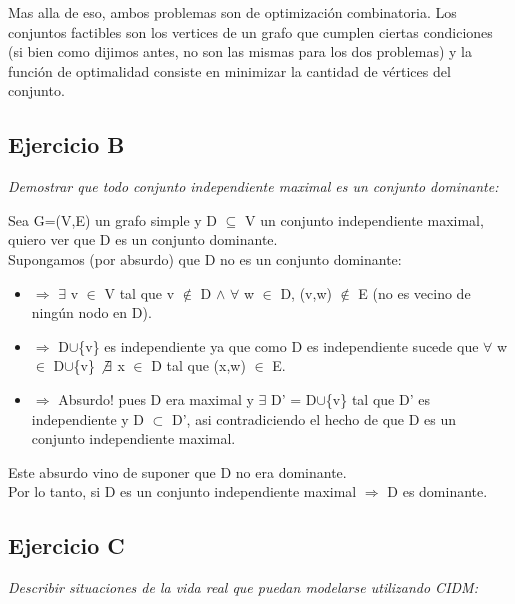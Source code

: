 Mas alla de eso, ambos problemas son de optimización combinatoria. Los conjuntos factibles son los vertices de un grafo que cumplen ciertas condiciones (si bien como dijimos antes, no son las mismas para los dos problemas) y la función de optimalidad consiste en minimizar la cantidad de vértices del conjunto.

\newpage

\subsection{Ejercicio B}

\textit{Demostrar que todo conjunto independiente maximal es un conjunto dominante:}

\medskip

Sea G=(V,E) un grafo simple y D $\subseteq$ V un conjunto independiente maximal, quiero ver que D es un conjunto dominante.\\
Supongamos (por absurdo) que D no es un conjunto dominante:
\begin{itemize}
\item[] $\Rightarrow$ $\exists$ v $\in$ V tal que v $\not\in$ D $\wedge$ $\forall$ w $\in$ D, (v,w) $\not\in$ E (no es vecino de ningún nodo en D).
\item[] $\Rightarrow$ D$\cup$\{v\} es independiente ya que como D es independiente sucede que $\forall$ w $\in$ D$\cup$\{v\} $\not\exists$ x $\in$ D tal que (x,w) $\in$ E.
\item[] $\Rightarrow$ Absurdo! pues D era maximal y $\exists$ D' = D$\cup$\{v\} tal que D' es independiente y D $\subset$ D', asi contradiciendo el hecho de que D es un conjunto independiente maximal.
\end{itemize}
Este absurdo vino de suponer que D no era dominante.\\
Por lo tanto, si D es un conjunto independiente maximal $\Rightarrow$ D es dominante.

\subsection{Ejercicio C}

\textit{Describir situaciones de la vida real que puedan modelarse utilizando CIDM:}

\medskip

